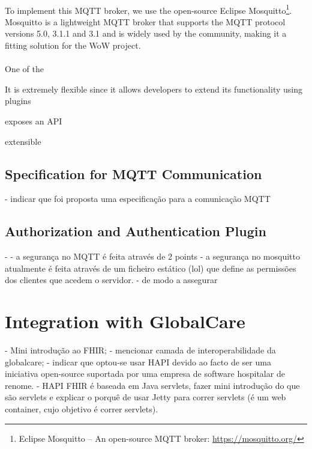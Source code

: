 \paragraph{} To implement this \acs{MQTT} broker, we use the open-source Eclipse Mosquitto\footnote{Eclipse Mosquitto -- An open-source \acs{MQTT} broker: \url{https://mosquitto.org/}}. Mosquitto is a lightweight \acs{MQTT} broker that supports the \acs{MQTT} protocol versions 5.0, 3.1.1 and 3.1 and is widely used by the community, making it a fitting solution for the \acs{WoW} project.

\paragraph{} One of the 



It is extremely flexible since it allows developers to extend its functionality using plugins

exposes an \acs{API}

extensible 

\paragraph{} 


\subsection{Specification for \acs{MQTT} Communication}
- indicar que foi proposta uma especificação para a comunicação MQTT

\subsection{Authorization and Authentication Plugin}
- 
- a segurança no MQTT é feita através de 2 points
- a segurança no mosquitto atualmente é feita através de um ficheiro estático (lol) que define as permissões dos clientes que acedem o servidor.
- de modo a assegurar 

\section{Integration with GlobalCare}

- Mini introdução ao FHIR;
- mencionar camada de interoperabilidade da globalcare;
- indicar que optou-se usar HAPI devido ao facto de ser uma iniciativa open-source suportada por uma empresa de software hospitalar de renome.
- HAPI FHIR é baseada em Java servlets, fazer mini introdução do que são servlets e explicar o porquê de usar Jetty para correr servlets (é um web container, cujo objetivo é correr servlets). 

